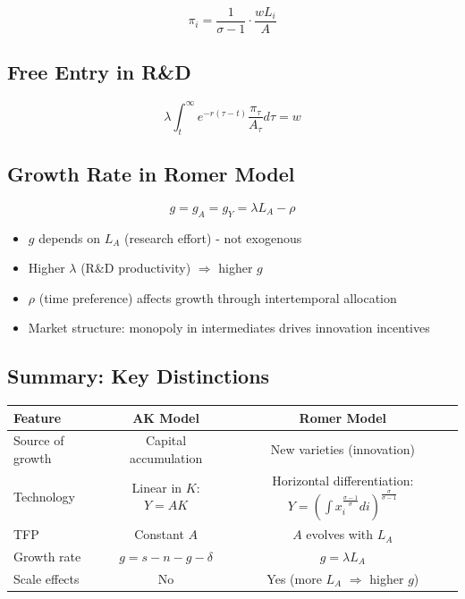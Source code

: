 \begin{resultbox}
\[
\boxed{\pi_i = \frac{1}{\sigma-1} \cdot \frac{w L_i}{A}}
\tag{Profit}
\]
\end{resultbox}

\medskip
\subsection*{Free Entry in R\&D}
\[
\lambda \int_t^\infty e^{-r(\tau-t)} \frac{\pi_\tau}{A_\tau} d\tau = w
\tag{No-Arbitrage}
\]

\medskip
\subsection*{Growth Rate in Romer Model}
\begin{resultbox}
\[
\boxed{g = g_A = g_Y = \lambda L_A - \rho}
\tag{Romer-Growth-Rate}
\]
\end{resultbox}

\begin{tcolorbox}[colback=green!5,colframe=green3,title=Intuition: Endogenous Growth]
\begin{itemize}
    \item $g$ depends on $L_A$ (research effort) - not exogenous
    \item Higher $\lambda$ (R\&D productivity) $\Rightarrow$ higher $g$
    \item $\rho$ (time preference) affects growth through intertemporal allocation
    \item Market structure: monopoly in intermediates drives innovation incentives
\end{itemize}
\end{tcolorbox}

\medskip
\subsection*{Summary: Key Distinctions}
\begin{center}
\begin{tabular}{lcc}
\toprule
Feature & AK Model & Romer Model \\
\midrule
Source of growth & Capital accumulation & New varieties (innovation) \\
Technology & Linear in $K$: $Y=AK$ & Horizontal differentiation: $Y = \left(\int x_i^{\frac{\sigma-1}{\sigma}} di\right)^{\frac{\sigma}{\sigma-1}}$ \\
TFP & Constant $A$ & $A$ evolves with $L_A$ \\
Growth rate & $g = s - n - g - \delta$ & $g = \lambda L_A$ \\
Scale effects & No & Yes (more $L_A$ $\Rightarrow$ higher $g$) \\
\bottomrule
\end{tabular}
\end{center}
